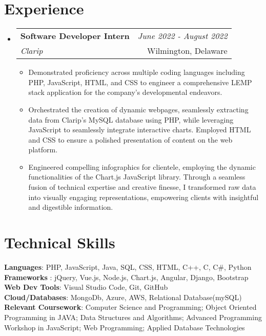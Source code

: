 \documentclass[a4paper,11pt]{article}
\makeatletter
\newcommand{\resumeSubheading}[4]{
\vspace{0.5mm}\item
    \begin{tabular*}{0.98\textwidth}[t]{l@{\extracolsep{\fill}}r}
        \textbf{#1} & \textit{\footnotesize{#4}} \\
        \textit{\footnotesize{#3}} &  \footnotesize{#2}\\
    \end{tabular*}
    \vspace{-2.4mm}
}
\newcommand{\resumeSubHeadingListStart}{\begin{itemize}[leftmargin=*,labelsep=0mm]}
\newcommand{\resumeItemListStart}{\begin{justify}\begin{itemize}[leftmargin=3ex, rightmargin=2ex, noitemsep,labelsep=1.2mm,itemsep=0mm]\small}
\newcommand{\resumeSubHeadingListEnd}{\end{itemize}\vspace{2mm}}
\newcommand{\resumeItemListEnd}{\end{itemize}\end{justify}\vspace{-2mm}}
\makeatother
\begin{document}
\section{\textbf{Experience}}
  \resumeSubHeadingListStart
    \resumeSubheading
      { Software Developer Intern}{Wilmington, Delaware}
      {Clarip}{June 2022 - August 2022}
      \vspace{-2.0mm}
      \resumeItemListStart
    \item {Demonstrated proficiency across multiple coding languages including PHP, JavaScript, HTML, and CSS to engineer a comprehensive LEMP stack application for the company's developmental endeavors.}
    \item { Orchestrated the creation of dynamic webpages, seamlessly extracting data from Clarip's MySQL database using PHP, while leveraging JavaScript to seamlessly integrate interactive charts. Employed HTML and CSS to ensure a polished presentation of content on the web platform.}
    \item {Engineered compelling infographics for clientele, employing the dynamic functionalities of the Chart.js JavaScript library. Through a seamless fusion of technical expertise and creative finesse, I transformed raw data into visually engaging representations, empowering clients with insightful and digestible information.}
    \resumeItemListEnd
    
    \vspace{-3.0mm}
    \vspace{-3.0mm}
      
  \resumeSubHeadingListEnd
\vspace{-5.5mm}







\section{\textbf{Technical Skills}}
 \begin{itemize}[leftmargin=0.05in, label={}]
    \small{\item{
     \textbf{Languages}{: PHP, JavaScript, Java, SQL, CSS, HTML, C++, C, C\#, Python } \\
     \textbf{Frameworks }{: jQuery, Vue.js, Node.js, Chart.js, Angular, Django, Bootstrap}\\ 
     \textbf{Web Dev Tools}{: Visual Studio Code, Git, GitHub } \\ 
     \textbf{Cloud/Databases}{: MongoDb, Azure, AWS, Relational Database(mySQL) } \\  
     
     \textbf{Relevant Coursework}{: Computer Science and Programming; Object Oriented Programming in JAVA; Data Structures and Algorithms; Advanced Programming Workshop in JavaScript; Web Programming; Applied Database Technologies } \\ 
     
    }}
 \end{itemize}
 \vspace{-16pt}
\end{document}

